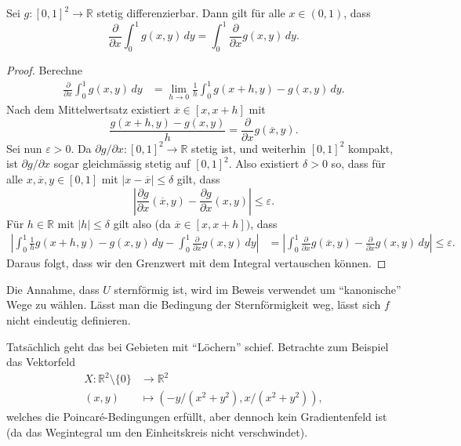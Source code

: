 \documentclass[../main.tex]{subfiles}
\begin{document}
\begin{lemma*}
  Sei $g \colon {[0, 1]}^2 \to \mathbb{R}$ stetig differenzierbar.
  Dann gilt für alle $x \in (0, 1)$, dass
  \[
    \frac{\partial}{\partial x} \int_{0}^{1} g(x, y) \, dy
    = \int_{0}^{1} \frac{\partial}{\partial x} g(x, y) \, dy.
  \]
\end{lemma*}

\begin{proof}
  Berechne
  \begin{align*}
    \frac{\partial}{\partial x}
    \int_{0}^{1} g(x, y) \, dy
    &= \lim_{h \to 0} \frac{1}{h}
    \int_{0}^{1} g(x + h, y) - g(x, y) \, dy.
  \end{align*}
  Nach dem Mittelwertsatz existiert
  $\overline x \in [x, x + h]$ mit
  \[
    \frac{g(x + h, y) - g(x, y)}{h}= \frac{\partial}{\partial x}
    g(\overline x, y).
  \]
  Sei nun $\varepsilon > 0$.
  Da $\partial g / \partial x \colon {[0, 1]}^2 \to \mathbb{R}$
  stetig ist, und weiterhin ${[0, 1]}^2$ kompakt,
  ist $\partial g/\partial x$ sogar gleichmässig stetig
  auf  ${[0, 1]}^2$.
  Also existiert $\delta > 0$ so, dass für alle
  $x, \overline x, y \in [0,1]$ mit $|x - \overline x| \leq \delta$
  gilt, dass
  \[
    \left| \frac{\partial g}{\partial x}(\overline x, y)
    - \frac{\partial g}{\partial x}(x, y) \right| \leq \varepsilon.
  \]
  Für $h \in \mathbb{R}$ mit $|h| \leq \delta$
  gilt also (da $\overline x \in [x, x + h])$, dass
  \begin{align*}
    \left| \int_{0}^{1} \frac{1}{h}
    g(x + h, y) - g(x, y)\, dy
    - \int_{0}^{1} \frac{\partial}{\partial x}g(x, y) \, dy \right|
    &= \left|
    \int_{0}^{1}
    \frac{\partial}{\partial x} g(\overline x, y)
    - \frac{\partial}{\partial x}g(x, y)\, dy \right|
    \leq \varepsilon.
  \end{align*}
  Daraus folgt, dass wir den Grenzwert mit dem Integral
  vertauschen können.
\end{proof}

\begin{remark}
  Die Annahme, dass $U$ sternförmig ist, wird im Beweis
  verwendet um ``kanonische'' Wege zu wählen.
  Lässt man die Bedingung der Sternförmigkeit weg,
  lässt sich $f$ nicht eindeutig definieren.

  Tatsächlich geht das bei Gebieten mit ``Löchern''
  schief. Betrachte zum
  Beispiel das Vektorfeld
  \begin{align*}
    X \colon \mathbb{R}^2 \setminus \{0\} & \to \mathbb{R}^2\\
    (x, y) & \mapsto (-y/(x^2 + y^2), x/(x^2 + y^2)),
  \end{align*}
  welches die Poincaré-Bedingungen erfüllt, aber dennoch
  kein Gradientenfeld ist (da das Wegintegral um den Einheitskreis
  nicht verschwindet).
\end{remark}
\end{document}
